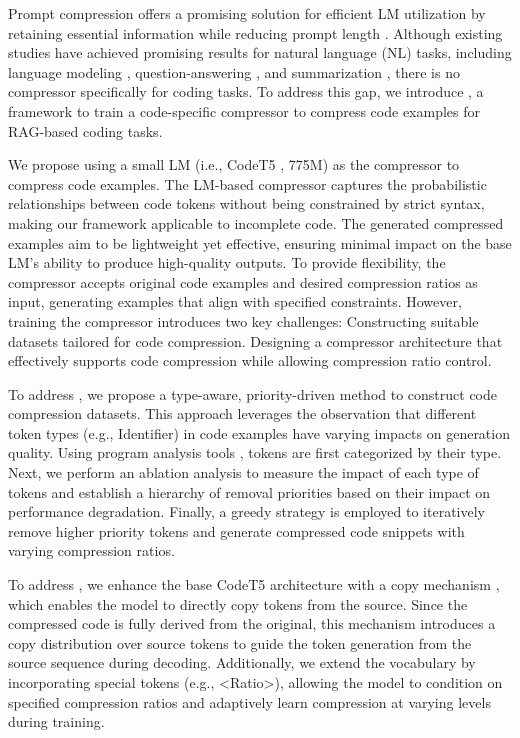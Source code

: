 Prompt compression offers a promising solution for efficient LM utilization  by retaining essential information while reducing prompt length \citep{efficient}. Although existing studies have achieved promising results for natural language (NL) tasks, including language modeling \citep{recomp,soft,gist}, question-answering \citep{rl}, and summarization \citep{llmlingua,selective}, there is no compressor specifically for coding tasks. To address this gap, we introduce \ourtool, a framework to train a code-specific compressor to compress code examples for RAG-based coding tasks. 

We propose using a small LM (i.e., CodeT5 \citep{codet5}, 775M) as the compressor to compress code examples. The LM-based compressor captures the probabilistic relationships between code tokens without being constrained by strict syntax, making our framework applicable to incomplete code. The generated compressed examples aim to be lightweight yet effective, ensuring minimal impact on the base LM’s ability to produce high-quality outputs. To provide flexibility, the compressor accepts original code examples and desired compression ratios as input, generating examples that align with specified constraints. However, training the compressor introduces two key challenges:  Constructing suitable datasets tailored for code compression.  Designing a compressor architecture that effectively supports code compression while allowing compression ratio control.

To address , we propose a type-aware, priority-driven method to construct code compression datasets. This approach leverages the observation that different token types (e.g., Identifier) in code examples  have varying impacts on generation quality. Using program analysis tools \citep{codelm}, tokens are first categorized by their type. Next, we perform an ablation analysis to measure the impact of each type of tokens and establish a hierarchy of removal priorities based on their impact on performance degradation. Finally, a greedy strategy is employed to iteratively remove higher priority tokens and generate compressed code snippets with varying compression ratios.

To address , we enhance the base CodeT5 architecture with a copy mechanism \citep{copy,copy1}, which enables the model to directly copy tokens from the source. Since the compressed code is fully derived from the original, this mechanism introduces a copy distribution over source tokens to guide the token generation from the source sequence during decoding. Additionally, we extend the vocabulary by incorporating special tokens (e.g., <Ratio>), allowing the model to condition on specified compression ratios and adaptively learn compression at varying levels during training.


